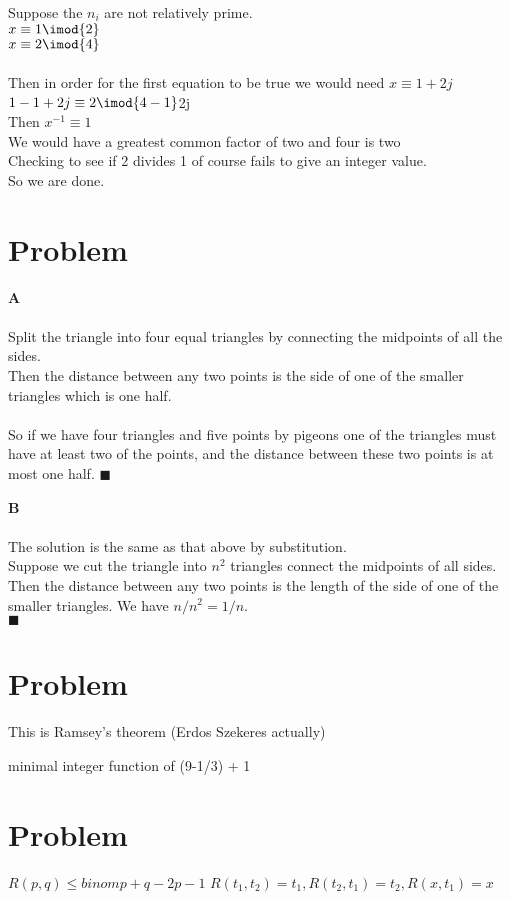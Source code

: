 \documentclass{article}
\begin{document}
    \bigskip
    Suppose the $n_{i}$ are not relatively prime.
    \\
    $x \equiv 1\imod{2}$
    \\
    $x \equiv 2\imod{4}$
    \\ \\
    Then in order for the first equation to be true we would need $x \equiv 1 +2j$ \\
    $1 - 1 + 2j \equiv 2\imod{4 - 1} 
    \\
    $2j      
    \\ 
    Then $x^{-1} \equiv 1$
    \\
    We would have a greatest common factor of two and four is two
    \\
    Checking to see if 2 divides 1 of course fails to give an integer value.
    \\
    So we are done.
    \pagebreak
    

\section*{Problem}
    \textbf{A}
    \\ \\
    Split the triangle into four equal triangles by connecting the midpoints of all the sides. \\ Then the distance between any two points is the side of one of the smaller triangles which is one half. 
    \\ \\
    So if we have four triangles and five points by pigeons one of the triangles must have at least two of the points, and the distance between these two points is at most one half.
    \bigskip
    $\blacksquare$
    
    \textbf{B} 
    \\ \\
    The solution is the same as that above by substitution.
    \\
    Suppose we cut the triangle into $n^{2}$ triangles connect the midpoints of all sides. Then the distance between any two points is the length of the side of one of the smaller triangles. We have $n/n^{2} = 1/n$.
    \\
    $\blacksquare$
    
\bigskip

\section*{Problem }
    This is Ramsey's theorem (Erdos Szekeres actually) 
    
    minimal integer function of (9-1/3) + 1
    
\bigskip

\section*{Problem}
    $R(p,q) \leq binom{p+q-2}{p-1}$
    $R(t_{1},t_{2}) = t_{1}, R(t_{2},t_{1}) = t_{2}, R(x, t_{1}) = x$
\end{document}

